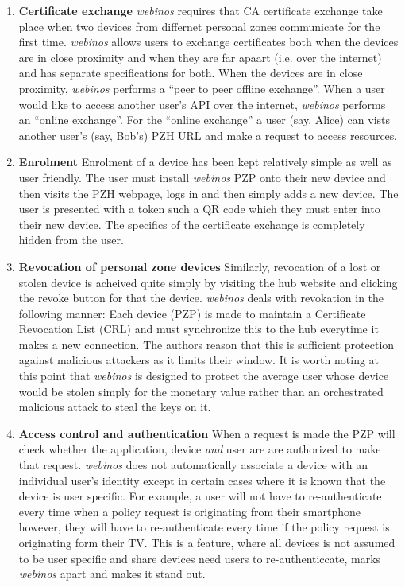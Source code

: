 \begin{enumerate}[label=\arabic*., wide, labelwidth=!, labelindent=0pt]
	\item \textbf{Certificate exchange} \textit{webinos} requires that CA certificate exchange take place when two devices from differnet 						personal zones communicate for the first time. \textit{webinos} allows users to exchange certificates both when the devices are in close 					proximity and when they are far apaart (i.e. over the internet) and has separate specifications for both. When the devices are in close 							proximity, \textit{webinos} performs a ``peer to peer offline exchange''. When a user would like to access another user's API over the 						internet, \textit{webinos} performs an ``online exchange''. For the ``online exchange'' a user (say, Alice) can vists another user's (say, Bob's) 			PZH URL and make a request to access resources. \\
	
	\item \textbf{Enrolment} Enrolment of a device has been kept relatively simple as well as user friendly. The user must install \textit{webinos} 			PZP onto their new device and then visits the PZH webpage, logs in and then simply adds a new device. The user is presented with a token such 	a 	QR code which they must enter into their new device. The specifics of the certificate exchange is completely hidden from the user.\\
	
	\item \textbf{Revocation of personal zone devices} Similarly, revocation of a lost or stolen device is acheived quite simply by visiting the hub 				website and clicking the revoke button for that the device. \textit{webinos} deals with revokation in the following manner: Each device (PZP) is 			made to maintain a Certificate Revocation List (CRL) and must synchronize this to the hub everytime it makes a new connection. The authors 			reason that this is sufficient protection against malicious attackers as it limits their window. It is worth noting at this point that \textit{webinos} 		is 	designed to protect the average user whose device would be stolen simply for the monetary value rather than an orchestrated malicious 					attack to steal the keys on it.\\
	
	\item \textbf{Access control and authentication} When a request is made the PZP will check whether the application, device \textit{and} user 			are are authorized to make that request. \textit{webinos} does not automatically associate a device with an individual user's identity except in 			certain cases where it is known that the device is user specific. For example, a user will not have to re-authenticate every time when a policy 				request is originating from their smartphone however, they will have to re-authenticate every time if the policy request is originating form their 			TV. This is a feature, where all devices is not assumed to be user specific and share devices need users to re-authenticcate, marks 								\textit{webinos} apart and makes it stand out. \\
	

\end{enumerate}
